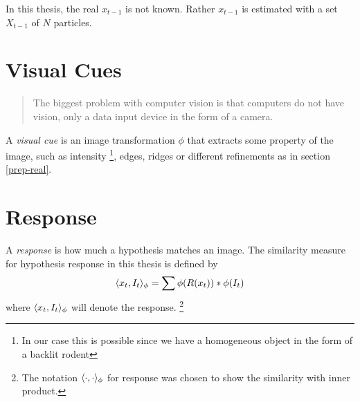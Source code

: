 
In this thesis, the real $x_{t-1}$ is not known. Rather $x_{t-1}$ is
estimated with a set $X_{t-1}$ of $N$ particles.

\section{Visual Cues}
\begin{quote}
    The biggest problem with computer vision is that computers do not have
    vision, only a data input device in the form of a camera.
\end{quote}
A \emph{visual cue} is an image transformation $\phi$ that extracts
some property of the image, such as intensity \footnote{In our case
  this is possible since we have a homogeneous object in the form of a
  backlit rodent}, edges, ridges\cite{Hedvig} or different refinements
as in section \ref{prep-real}.

\section{Response}
\label{sec:response}

\begin{definition}
  A \emph{response} is how much a hypothesis matches an image. The
  similarity measure for hypothesis response in this thesis is defined
  by
    \begin{equation}
        \label{eq:response}
        \langle x_t, I_t\rangle_{\phi} = \sum{\phi(R(x_t))*\phi(I_t)}
    \end{equation}
    where $\langle x_t, I_t\rangle_{\phi}$ will denote the response.
    \footnote{The notation $\langle \cdot, \cdot\rangle_{\phi}$ for
      response was chosen to show the similarity with inner product.}

\end{definition}


